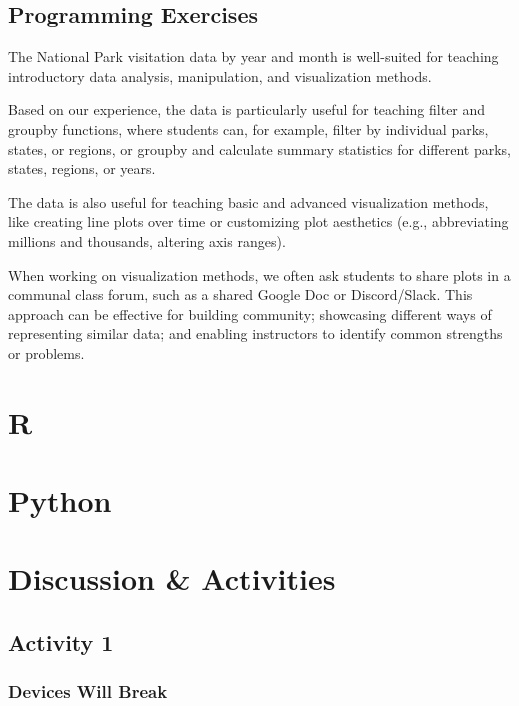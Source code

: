 \documentclass[
  letterpaper,
  DIV=11,
  numbers=noendperiod]{scrartcl}
\begin{document}
\subsection{Programming Exercises}\label{programming-exercises}

The National Park visitation data by year and month is well-suited for
teaching introductory data analysis, manipulation, and visualization
methods.

Based on our experience, the data is particularly useful for teaching
filter and groupby functions, where students can, for example, filter by
individual parks, states, or regions, or groupby and calculate summary
statistics for different parks, states, regions, or years.

The data is also useful for teaching basic and advanced visualization
methods, like creating line plots over time or customizing plot
aesthetics (e.g., abbreviating millions and thousands, altering axis
ranges).

When working on visualization methods, we often ask students to share
plots in a communal class forum, such as a shared Google Doc or
Discord/Slack. This approach can be effective for building community;
showcasing different ways of representing similar data; and enabling
instructors to identify common strengths or problems.

\section{R}

\label{exercise-posts-r}

\section{Python}

\label{exercise-posts-python}

\section{Discussion \& Activities}

\subsection{Activity 1}\label{activity-1-1}

\subsubsection{Devices Will Break}\label{devices-will-break}
\end{document}
